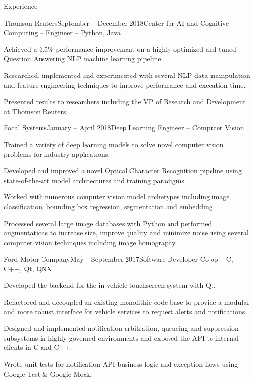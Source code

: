 \documentclass{resume} %
\begin{document}
\begin{rSection}{Experience}

\begin{rSubsection}{Thomson Reuters}{September -- December 2018}{Center for AI and Cognitive Computing -- Engineer -- Python, Java}{}
\item Achieved a 3.5\% performance improvement on a highly optimized and tuned Question Answering NLP machine learning pipeline.
\item Researched, implemented and experimented with several NLP data manipulation and feature engineering techniques to improve performance and execution time.
\item Presented results to researchers including the 
VP of Research and Development at Thomson Reuters
\end{rSubsection}

\begin{rSubsection}{Focal Systems}{January -- April 2018}{Deep Learning Engineer -- Computer Vision}{}
	\item Trained a variety of deep learning models to solve novel computer vision problems for industry applications.
	\item Developed and improved a novel Optical Character Recognition pipeline using state-of-the-art model architectures and training paradigms.
	\item Worked with numerous computer vision model archetypes including image classification, bounding box regression, segmentation and embedding.
	\item Processed several large image databases with Python and performed augmentations to increase size, improve quality and minimize noise using several computer vision techniques including image homography.
\end{rSubsection}

\begin{rSubsection}{Ford Motor Company}{May -- September 2017}{Software Developer Co-op -- C, C++, Qt, QNX}{}

\item Developed the backend for the in-vehicle touchscreen system with Qt. 
\item Refactored and decoupled an existing monolithic code base to provide a modular and more robust interface for vehicle services to request alerts and notifications.
\item Designed and implemented notification arbitration, queueing and suppression subsystems in highly governed environments and exposed the API to internal clients in C and C++.
\item Wrote unit tests for notification API business logic and exception flows using Google Test \& Google Mock.


\end{rSubsection}
\end{rSection}
\end{document}
